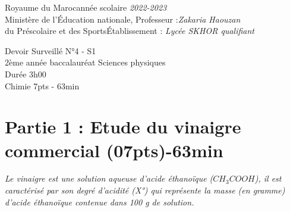 \documentclass[12pt]{article}
\newcommand\headerMe[2]{\noindent{}#1\hfill#2}
\begin{document}
\headerMe{Royaume du Maroc}{année scolaire \emph{2022-2023}}\\
\headerMe{Ministère de l'Éducation nationale, }{  Professeur :\emph{Zakaria Haouzan}}\\
\headerMe{du Préscolaire et des Sports}{Établissement : \emph{Lycée SKHOR qualifiant}}\\
\begin{center}
Devoir Surveillé  N°4 - S1 \\
    2ème année baccalauréat Sciences physiques\\
Durée 3h00
\\
    \vspace{.2cm}
\hrulefill
\Large{Chimie 7pts - 63min}
\hrulefill\\

\end{center}

 \section*{Partie 1 : Etude du vinaigre commercial \dotfill(07pts)-63min }



 \emph{Le vinaigre est une solution aqueuse d’acide éthanoïque ($CH_3COOH$), il est
caractérisé par son degré d’acidité (X°) qui représente la masse (en gramme)
d’acide éthanoïque contenue dans 100 g de solution.}
\end{document}
